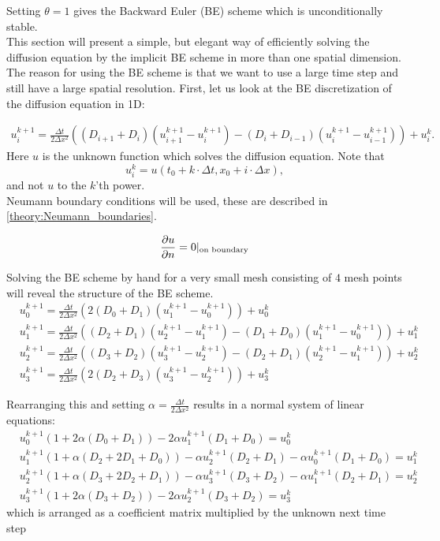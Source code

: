 Setting $\theta = 1$ gives the  Backward Euler (BE) scheme which is unconditionally stable. \\
This section will present a simple, but elegant way of efficiently solving the diffusion equation by the implicit BE scheme in more than one spatial dimension. The reason for using the BE scheme is that we want to use a large time step and still have a large spatial resolution. 
First, let us look at the BE discretization of the diffusion equation in 1D: 

\begin{align}\label{theory:BE_scheme_1D}
 u^{k+1}_i = \frac{\Delta t}{2\Delta x^2}\left((D_{i+1}+D_{i})(u^{k+1}_{i+1}-u^{k+1}_{i})-(D_{i}+D_{i-1})(u^{k+1}_{i}-u^{k+1}_{i-1})\right) + u^k_i.
\end{align}
Here $u$ is the unknown function which solves the diffusion equation. 
Note that 
$$u^k_i = u(t_0+k\cdot\Delta t,x_0+i\cdot\Delta x),$$
and not $u$ to the $k$'th power. \\
Neumann boundary conditions will be used, these are described in \eqref{theory:Neumann_boundaries}.

\begin{equation}\label{theory:Neumann_boundaries}
 \frac{\partial u}{\partial n} = 0|_{\text{on boundary}}
\end{equation}

\noindent Solving the BE scheme by hand for a very small mesh consisting of $4$ mesh points will reveal the structure of the BE scheme.
\begin{align*}
 &u^{k+1}_0 =  \frac{\Delta t}{2\Delta x^2}\left(2(D_{0}+D_{1})(u^{k+1}_{1}-u^{k+1}_{0})\right) + u^k_0\\
 &u^{k+1}_1 = \frac{\Delta t}{2\Delta x^2}\left((D_{2}+D_{1})(u^{k+1}_{2}-u^{k+1}_{1})-(D_{1}+D_{0})(u^{k+1}_{1}-u^{k+1}_{0})\right) + u^k_1\\
 &u^{k+1}_2 = \frac{\Delta t}{2\Delta x^2}\left((D_{3}+D_{2})(u^{k+1}_{3}-u^{k+1}_{2})-(D_{2}+D_{1})(u^{k+1}_{2}-u^{k+1}_{1})\right) + u^k_2 \\
 &u^{k+1}_3 =  \frac{\Delta t}{2\Delta x^2}\left(2(D_{2}+D_{3})(u^{k+1}_{3}-u^{k+1}_{2})\right) + u^k_3
\end{align*}

\noindent Rearranging this and setting $\alpha = \frac{\Delta t}{2\Delta x^2}$ results in a normal system of linear equations:
\begin{align*}
 &u^{k+1}_0\left(1+2\alpha(D_0+D_1)\right)- 2\alpha u^{k+1}_{1}(D_1+D_0) =  u^k_0\\
 &u^{k+1}_1\left(1+\alpha(D_2+2D_1+D_0)\right)-\alpha u^{k+1}_{2}(D_2+D_1)-\alpha u^{k+1}_{0}(D_1+D_0) = u^k_1\\
 &u^{k+1}_2\left(1+\alpha(D_3+2D_2+D_1)\right)-\alpha u^{k+1}_{3}(D_3+D_2)-\alpha u^{k+1}_{1}(D_2+D_1) = u^k_2\\
 &u^{k+1}_3\left(1+2\alpha(D_3+D_2)\right)- 2\alpha u^{k+1}_{2}(D_3+D_2) =  u^k_3
\end{align*}
which is arranged as a coefficient matrix multiplied by the unknown next time step

